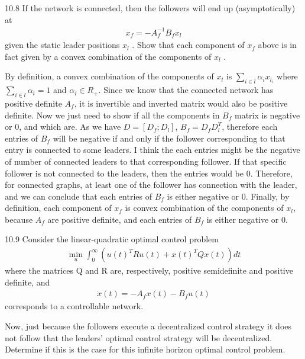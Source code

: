 \documentclass{article}
\begin{document}
\newpage
\begin{problem} 10.8
    If the network is connected, then the followers will end up (asymptotically) at
    \begin{align*}
        x_f = -A_f^{-1} B_f x_l
    \end{align*}
    given the static leader positions $x_l$ . Show that each component of $x_f$ above is in fact given by a convex combination of the components of $x_l$ .

    By definition, a convex combination of the components of $x_l$ is $\sum_{i\in l}\alpha_i x_{l_i}$ where $\sum_{i\in l} \alpha_i = 1$ and $\alpha_i \in R_+ $. Since we know that the connected network has positive definite $A_f$, it is invertible and inverted matrix would also be positive definite. Now we just need to show if all the components in $B_f$ matrix is negative or 0, and which are. As we have $D = [D_f; D_l]$, $B_f = D_f D_l^T$, therefore each entries of $B_f$ will be negative if and only if the follower corresponding to that entry is connected to some leaders. I think the each entries might be the negative of number of connected leaders to that corresponding follower. If that specific follower is not connected to the leaders, then the entries would be 0. Therefore, for connected graphs, at least one of the follower has connection with the leader, and we can conclude that each entries of $B_f$ is either negative or 0. Finally, by definition, each component of $x_f$ is convex combination of the components of $x_l$, because $A_f$ are positive definite, and each entries of $B_f$ is either negative or 0.  
\end{problem}
\begin{problem} 10.9
    Consider the linear-quadratic optimal control problem
    \begin{align*}
        \min_{u} \int_{0}^{\infty} (u(t)^T R u(t) + x(t)^T Q x(t))dt
    \end{align*}
    where the matrices Q and R are, respectively, positive semideﬁnite and positive definite, and 
    \begin{align*}
        \dot x(t) = -A_f x(t) - B_f u(t) 
    \end{align*}
    corresponds to a controllable network.

    Now, just because the followers execute a decentralized control strategy it does not follow that the leaders’ optimal control strategy will be decentralized. Determine if this is the case for this inﬁnite horizon optimal control problem.
\end{problem}
\end{document}
